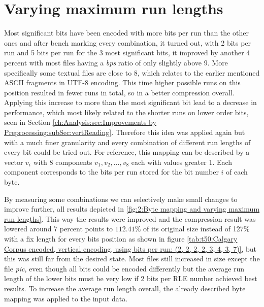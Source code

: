 \section{Varying maximum run lengths}
\label{ch:Conceptual Design:sec:var lengths}
\par{
Most significant bits have been encoded with more bits per run than the other ones and after bench marking every combination, it turned out, with 2 bits per run and 5 bits per run for the 3 most significant bits, it improved by another 4 percent with most files having a \textit{bps} ratio of only slightly above 9. More specifically some textual files are close to 8, which relates to the earlier mentioned ASCII fragments in UTF-8 encoding. This time higher possible runs on this position resulted in fewer runs in total, so in a better compression overall. Applying this increase to more than the most significant bit lead to a decrease in performance, which most likely related to the shorter runs on lower order bits, seen in Section \ref{ch:Analysis:sec:Improvements by Preprocessing:subSec:vertReading}. Therefore this idea was applied again but with a much finer granularity and every combination of different run lengths of every bit could be tried out. For reference, this mapping can be described by a vector $v_i$ with 8 components $v_1,v_2,...,v_8$ each with values greater 1. Each component corresponds to the bits per run stored for the bit number $i$ of each byte.
}
\par{
By measuring some combinations we can selectively make small changes to improve further, all results depicted in \ref{fig:2:Byte mapping and varying maximum run lengths}. This way the results were improved and the compression result was lowered around 7 percent points to $112.41\%$ of its original size instead of 127\% with a fix length for every bits position as shown in figure \ref{tab:t50:Calgary Corpus encoded, vertical encoding, using bits per run: (2, 2, 2, 2, 3, 4, 3, 7)}, but this was still far from the desired state. Most files still increased in size except the file \textit{pic}, even though all bits could be encoded differently but the average run length of the lower bits must be very low if 2 bits per RLE number achieved best results. To increase the average run length overall, the already described byte mapping was applied to the input data.
}
